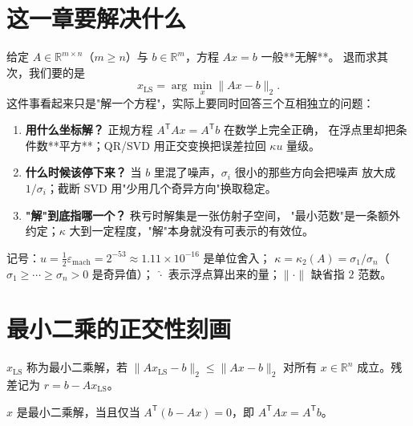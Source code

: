 

\section{这一章要解决什么}

给定 $A\in\mathbb{R}^{m\times n}$（$m\ge n$）与 $b\in\mathbb{R}^m$，方程 $Ax=b$ 一般**无解**。
退而求其次，我们要的是
\[
  x_{\mathrm{LS}}=\arg\min_{x}\|Ax-b\|_2 .
\]
这件事看起来只是"解一个方程"，实际上要同时回答三个互相独立的问题：

\begin{enumerate}
  \item \textbf{用什么坐标解？} 正规方程 $A^{\mathsf T}Ax=A^{\mathsf T}b$ 在数学上完全正确，
        在浮点里却把条件数**平方**；QR/SVD 用正交变换把误差拉回 $\kappa u$ 量级。
  \item \textbf{什么时候该停下来？} 当 $b$ 里混了噪声，$\sigma_i$ 很小的那些方向会把噪声
        放大成 $1/\sigma_i$；截断 SVD 用"少用几个奇异方向"换取稳定。
  \item \textbf{"解"到底指哪一个？} 秩亏时解集是一张仿射子空间，
        "最小范数"是一条额外约定；$\kappa$ 大到一定程度，"解"本身就没有可表示的有效位。
\end{enumerate}

记号：$u=\tfrac12\varepsilon_{\text{mach}}=2^{-53}\approx1.11\times10^{-16}$ 是单位舍入；
$\kappa=\kappa_2(A)=\sigma_1/\sigma_n$（$\sigma_1\ge\cdots\ge\sigma_n>0$ 是奇异值）；
$\hat{\cdot}$ 表示浮点算出来的量；$\|\cdot\|$ 缺省指 $2$ 范数。

\section{最小二乘的正交性刻画}

\begin{definition}[最小二乘解]
$x_{\mathrm{LS}}$ 称为最小二乘解，若 $\|Ax_{\mathrm{LS}}-b\|_2\le\|Ax-b\|_2$ 对所有
$x\in\mathbb{R}^n$ 成立。残差记为 $r=b-Ax_{\mathrm{LS}}$。
\end{definition}

\begin{theorem}[正规方程]
\label{thm:normal}
$x$ 是最小二乘解，当且仅当 $A^{\mathsf T}(b-Ax)=0$，即 $A^{\mathsf T}Ax=A^{\mathsf T}b$。
\end{theorem}

